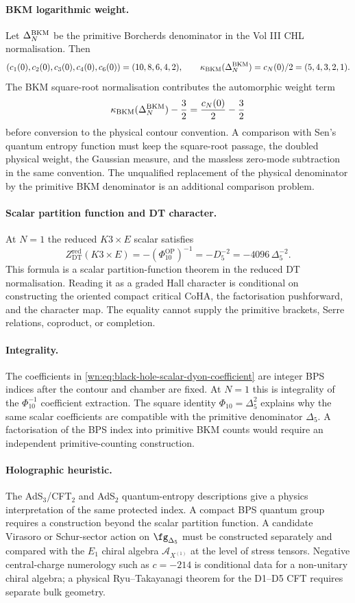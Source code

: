 \paragraph{BKM logarithmic weight.}
Let $\Delta^{\mathrm{BKM}}_N$ be the primitive Borcherds denominator in the Vol III CHL
normalisation. Then
\[
  (c_1(0),c_2(0),c_3(0),c_4(0),c_6(0))=(10,8,6,4,2),
  \qquad
  \kappa_{\mathrm{BKM}}(\Delta^{\mathrm{BKM}}_N)=c_N(0)/2=(5,4,3,2,1).
\label{wn:eq:black-hole-bkm-constants}
\]
The BKM square-root normalisation contributes the automorphic weight
term
\[
  \kappa_{\mathrm{BKM}}(\Delta^{\mathrm{BKM}}_N)-\frac32=\frac{c_N(0)}2-\frac32
\label{wn:eq:black-hole-bkm-log-weight}
\]
before conversion to the physical contour convention. A comparison with
Sen's quantum entropy function must keep the square-root passage, the
doubled physical weight, the Gaussian measure, and the massless
zero-mode subtraction in the same convention. The unqualified
replacement of the physical denominator by the primitive BKM denominator
is an additional comparison problem.

\paragraph{Scalar partition function and DT character.}
At $N=1$ the reduced $K3\times E$ scalar satisfies
\[
  Z_{\mathrm{DT}}^{\mathrm{red}}(K3\times E)
  =
  -(\Phi_{10}^{\mathrm{OP}})^{-1}
  =
  -D_5^{-2}
  =
  -4096\,\Delta_5^{-2}.
\label{wn:eq:black-hole-op-scalar}
\]
This formula is a scalar partition-function theorem in the reduced DT
normalisation. Reading it as a graded Hall character is conditional on
constructing the oriented compact critical CoHA, the factorisation
pushforward, and the character map. The equality cannot supply the
primitive brackets, Serre relations, coproduct, or completion.

\paragraph{Integrality.}
The coefficients in \eqref{wn:eq:black-hole-scalar-dyon-coefficient}
are integer BPS indices after the contour and chamber are fixed.
At $N=1$ this is integrality of the $\Phi_{10}^{-1}$ coefficient
extraction. The square identity $\Phi_{10}=\Delta_5^2$ explains why
the same scalar coefficients are compatible with the primitive
denominator $\Delta_5$. A factorisation of the BPS index into primitive
BKM counts would require an independent primitive-counting construction.

\paragraph{Holographic heuristic.}
The AdS$_3$/CFT$_2$ and AdS$_2$ quantum-entropy descriptions give a
physics interpretation of the same protected index. A compact BPS
quantum group requires a construction beyond the scalar partition
function. A candidate Virasoro or Schur-sector action on
$\fg_{\Delta_5}$ must be constructed separately and compared with the
$E_1$ chiral algebra $\mathcal A_{X^{(1)}}$ at the level of stress
tensors. Negative central-charge numerology such as $c=-214$ is
conditional data for a non-unitary chiral algebra; a physical
Ryu--Takayanagi theorem for the D1--D5 CFT requires separate bulk
geometry.

